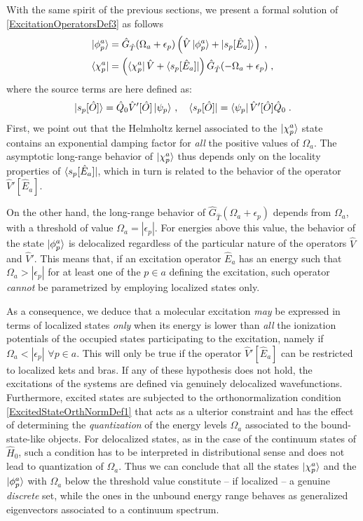 \documentclass[reprint,aps,prb]{revtex4-1}
\newcommand{\eps}{\epsilon}
\newcommand{\be}{\begin{equation}}
\newcommand{\ee}{\end{equation}}
\newcommand{\nn}{\notag}
\newcommand{\op}[1]{\hat {#1}}
\newcommand{\hnot}{\op{H}_0}
\newcommand{\GH}{\op G_{\op T}}
\begin{document}
With the same spirit of the previous sections, we present a formal solution of \eqref{ExcitationOperatorsDef3} as follows
\begin{align}
\ket{\phi^a_p} &= \GH(\Omega_a+\eps_p)\left(\op V \ket{\phi^a_p} + \ket{s_p[\op E_a]} \right) \;, \nn \\
\bra {\chi^a_p} &=\left(\bra{\chi^a_p} \op V  + \bra{s_p[\op E_a]}\right)  \GH(-\Omega_a+\eps_p)\;,
\end{align}
where the source terms are here defined as:
\be
 \ket{s_p[\op O]} =  \op Q_0 \op V'[\op O] \ket{\psi_p}\,, \quad
 \bra{s_p[\op O]} =   \bra{\psi_p} \op V'[\op O] \op Q_0 \nn \;.
\ee
First, we point out that the Helmholtz kernel associated to the $\ket{\chi^a_p}$ state
contains an exponential damping factor for \emph{all} the positive values of $\Omega_a$.
The asymptotic long-range behavior of $\ket{\chi^a_p}$ thus depends only on the locality properties of
$\bra{s_p[\op E_a]}$, which in turn is related to the behavior of the operator $\op V'[\op E_a]$.

On the other hand, the long-range behavior of $\GH(\Omega_a+\eps_p)$ depends from
$\Omega_a$, with a threshold of value $\Omega_a=|\eps_p|$.
For energies above this value, the behavior of the state $\ket{\phi^a_p}$ is
delocalized regardless of the particular nature of the operators $\op V$ and $\op V'$.
This means that, if an excitation operator $\op E_a$ has an energy such that
$\Omega_a>|\eps_p|$  for at least one of the $p \in a$ defining the excitation,
such operator \emph{cannot} be parametrized by employing localized states only.

As a consequence, we deduce that a molecular excitation \emph{may} be expressed in terms of localized states
\emph{only} when its energy is lower than \emph{all} the ionization potentials of the occupied states participating to the excitation,
namely if $\Omega_a<|\eps_p|$ $\forall p \in a$. This will only be true if the operator
$\op V'[\op E_a]$ can be restricted to localized kets and bras.
If any of these hypothesis does not hold, the excitations of the systems are defined via genuinely delocalized wavefunctions.
Furthermore, excited states are subjected to the orthonormalization condition
\eqref{ExcitedStateOrthNormDef1} that acts as a ulterior constraint and has the effect of determining the \emph{quantization}
of the energy levels $\Omega_a$ associated to the bound-state-like objects.
For delocalized states, as in the case of the continuum states of $\hnot$,
such a condition has to be interpreted in distributional sense and does not lead to quantization of $\Omega_a$.
Thus we can conclude that all the states $\ket{\chi^a_p}$ and the $\ket{\phi^a_p}$ with $\Omega_a$ below the threshold value constitute
-- if localized -- a genuine \emph{discrete} set, while the ones in the unbound energy range behaves as generalized eigenvectors associated to a
continuum spectrum.
\end{document}
